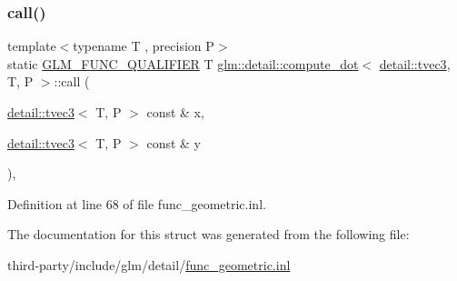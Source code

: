 \subsubsection{\texorpdfstring{call()}{call()}}
{\footnotesize\ttfamily template$<$typename T , precision P$>$ \\
static \hyperlink{setup_8hpp_a33fdea6f91c5f834105f7415e2a64407}{G\+L\+M\+\_\+\+F\+U\+N\+C\+\_\+\+Q\+U\+A\+L\+I\+F\+I\+ER} T \hyperlink{structglm_1_1detail_1_1compute__dot}{glm\+::detail\+::compute\+\_\+dot}$<$ \hyperlink{structglm_1_1detail_1_1tvec3}{detail\+::tvec3}, T, P $>$\+::call (\begin{DoxyParamCaption}\item[{\hyperlink{structglm_1_1detail_1_1tvec3}{detail\+::tvec3}$<$ T, P $>$ const \&}]{x,  }\item[{\hyperlink{structglm_1_1detail_1_1tvec3}{detail\+::tvec3}$<$ T, P $>$ const \&}]{y }\end{DoxyParamCaption})\hspace{0.3cm}{\ttfamily [inline]}, {\ttfamily [static]}}



Definition at line 68 of file func\+\_\+geometric.\+inl.



The documentation for this struct was generated from the following file\+:\begin{DoxyCompactItemize}
\item 
third-\/party/include/glm/detail/\hyperlink{func__geometric_8inl}{func\+\_\+geometric.\+inl}\end{DoxyCompactItemize}
